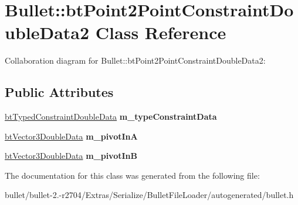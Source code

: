 \hypertarget{class_bullet_1_1bt_point2_point_constraint_double_data2}{\section{Bullet\+:\+:bt\+Point2\+Point\+Constraint\+Double\+Data2 Class Reference}
\label{class_bullet_1_1bt_point2_point_constraint_double_data2}
}


Collaboration diagram for Bullet\+:\+:bt\+Point2\+Point\+Constraint\+Double\+Data2\+:
\subsection*{Public Attributes}
\begin{DoxyCompactItemize}
\item 
\hypertarget{class_bullet_1_1bt_point2_point_constraint_double_data2_a0389ac94bc50c61e757560f1c0f2269d}{\hyperlink{class_bullet_1_1bt_typed_constraint_double_data}{bt\+Typed\+Constraint\+Double\+Data} {\bfseries m\+\_\+type\+Constraint\+Data}}\label{class_bullet_1_1bt_point2_point_constraint_double_data2_a0389ac94bc50c61e757560f1c0f2269d}

\item 
\hypertarget{class_bullet_1_1bt_point2_point_constraint_double_data2_a02dc5ff5539438bc9317a9a69255fbf6}{\hyperlink{class_bullet_1_1bt_vector3_double_data}{bt\+Vector3\+Double\+Data} {\bfseries m\+\_\+pivot\+In\+A}}\label{class_bullet_1_1bt_point2_point_constraint_double_data2_a02dc5ff5539438bc9317a9a69255fbf6}

\item 
\hypertarget{class_bullet_1_1bt_point2_point_constraint_double_data2_a81a1540afc4d62756db0e2813d02746d}{\hyperlink{class_bullet_1_1bt_vector3_double_data}{bt\+Vector3\+Double\+Data} {\bfseries m\+\_\+pivot\+In\+B}}\label{class_bullet_1_1bt_point2_point_constraint_double_data2_a81a1540afc4d62756db0e2813d02746d}

\end{DoxyCompactItemize}


The documentation for this class was generated from the following file\+:\begin{DoxyCompactItemize}
\item 
bullet/bullet-\/2.-\/r2704/\+Extras/\+Serialize/\+Bullet\+File\+Loader/autogenerated/bullet.\+h\end{DoxyCompactItemize}
